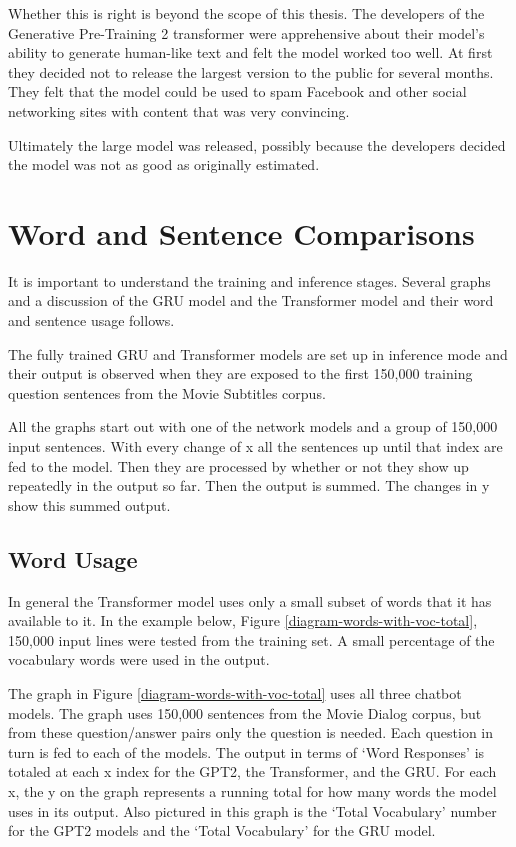 Whether this is right is beyond the scope of this thesis. The developers of the Generative Pre-Training 2 transformer were apprehensive about their model's ability to generate human-like text and felt the model worked too well. 
At first they decided not to release the largest version to the public for several months. 
They felt that the model could be used to spam Facebook and other social networking sites with content that was very convincing. 


Ultimately the large model was released, possibly because the developers decided the model was not as good as originally estimated. %

\section{Word and Sentence Comparisons}

It is important to understand the training and inference stages. Several graphs and a discussion of the GRU model and the Transformer model and their word and sentence usage follows.

The fully trained GRU and Transformer models are set up in inference mode and their output is observed when they are exposed to the first 150,000 training question sentences from the Movie Subtitles corpus.

All the graphs start out with one of the network models and a group of 150,000 input sentences. With every change of x all the sentences up until that index are fed to the model. Then they are processed by whether or not they show up repeatedly in the output so far. Then the output is summed. The changes in y show this summed output.

\subsection{Word Usage}

In general the Transformer model uses only a small subset of words that it has available to it. In the example below, Figure \ref{diagram-words-with-voc-total}, 150,000 input lines were tested from the training set. A small percentage of the vocabulary words were used in the output. %

The graph in Figure \ref{diagram-words-with-voc-total} uses all three chatbot models. The graph uses 150,000 sentences from the Movie Dialog corpus, but from these question/answer pairs only the question is needed. Each question in turn is fed to each of the models. The output in terms of `Word Responses' is totaled at each x index for the GPT2, the Transformer, and the GRU. For each x, the y on the graph represents a running total for how many words the model uses in its output. Also pictured in this graph is the `Total Vocabulary' number for the GPT2 models and the `Total Vocabulary' for the GRU model.

